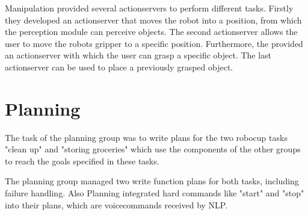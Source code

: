 \documentclass[main.tex]{subfiles}
\begin{document}
		Manipulation provided several actionservers to perform different tasks. Firstly they developed an actionserver that moves the robot into a position, from which the perception module can perceive objects. The second actionserver allows the user to move the robots gripper to a specific position. Furthermore, the provided an actionserver with which the user can grasp a specific object. The last actionserver can be used to place a previously grasped object.
		
		\section{Planning}
		The task of the planning group was to write plans for the two robocup tasks "clean up" and "storing groceries" which use the components of the other groups to reach the goals specified in these tasks.
		
		The planning group managed two write function plans for both tasks, including failure handling. Also Planning integrated hard commands like "start" and "stop" into their plans, which are voicecommands received by NLP.
	\endgroup
\end{document}
